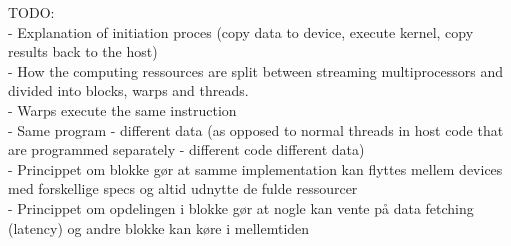 TODO: \\
- Explanation of initiation proces (copy data to device, execute kernel, copy results back to the host) \\
- How the computing ressources are split between streaming multiprocessors and divided into blocks, warps and threads. \\
- Warps execute the same instruction \\
- Same program - different data (as opposed to normal threads in host code that are programmed separately  - different code different data) \\
- Princippet om blokke gør at samme implementation kan flyttes mellem devices med forskellige specs og altid udnytte de fulde ressourcer \\
- Princippet om opdelingen i blokke gør at nogle kan vente på data fetching (latency) og andre blokke kan køre i mellemtiden









